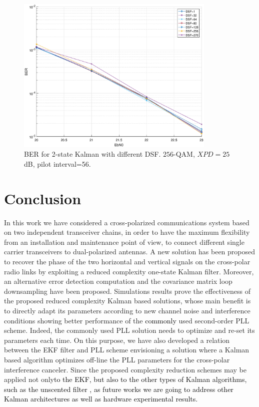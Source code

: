 \begin{figure}
	\includegraphics[width=0.85\textwidth]{figures/fig_red_kalman/xpic_xpd_25_qam_256_bis.eps}
	\caption{BER for 2-state Kalman with different DSF. $256$-QAM, $XPD=25$ dB, pilot interval=56.}
	\label{fig15}      
\end{figure}
\section{Conclusion}
\label{Concl}
In this work we have considered a cross-polarized communications system based on two independent transceiver chains, in order to have the maximum flexibility from an installation and maintenance point of view, to connect different single carrier transceivers to dual-polarized antennas.
A new solution has been proposed to recover the phase of the two horizontal and vertical signals on the cross-polar radio links by exploiting a reduced complexity one-state Kalman filter. Moreover, an alternative error detection computation and the covariance matrix loop downsampling have been proposed.
Simulations results prove the effectiveness of the proposed reduced complexity Kalman based solutions, whose main benefit is to directly adapt its parameters according to new channel noise and interference conditions showing better performance of the \textcolor{black}{commonly} used second-order PLL scheme. 
Indeed, the commonly used PLL solution needs to optimize and re-set its parameters each time. On this purpose, we have also developed a relation between the EKF filter and PLL scheme envisioning a solution where a Kalman based algorithm optimizes off-line the PLL parameters for the cross-polar interference canceler. Since the proposed complexity reduction schemes may be applied not only\textcolor{black}{to the EKF, but also to the other types of Kalman algorithms, such as the unscented filter \cite{Wan2000}, as future works we are going to address other Kalman architectures as well as hardware experimental results.} 
